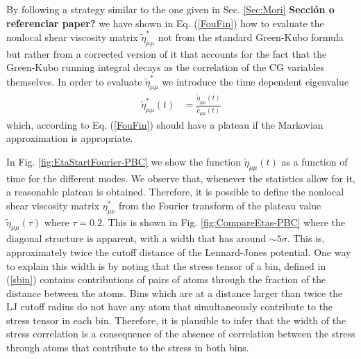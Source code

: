 \documentclass[a4paper,openright,12pt]{book}
\newcommand{\Note}[1]{{\bf \color{red}#1}}    %
\begin{document}
By following a  strategy similar to the one given  in Sec. \ref{Sec:Mori} \Note{Sección o referenciar paper?} we
have shown in  Eq. (\ref{FouFin}) how to evaluate  the nonlocal shear
viscosity  matrix  $\tilde{\eta}^*_{\mu\mu}$  not  from  the  standard
Green-Kubo  formula but  rather from  a corrected  version of  it that
accounts for the  fact that the Green-Kubo running  integral decays as
the correlation of  the CG variables themselves. In  order to evaluate
$\tilde{\eta}^*_{\mu\mu}$ we introduce the time dependent eigenvalue
\begin{align}
\tilde{\eta}_{\mu\mu}^*(t)&=\frac{\tilde{\eta}_{\mu\mu}(t) }{\tilde{c}_{\mu\mu}(t)}
\label{FouFint}
\end{align}
which, according  to Eq. (\ref{FouFin})  should have a plateau  if the
Markovian approximation is appropriate.

In    Fig.      \ref{fig:EtaStartFourier-PBC}    we    show     the    function
$\tilde{\eta}_{\mu\mu}(t)$  as a  function of  time for  the different
modes.   We observe  that, whenever  the  statistics allow  for it,  a
reasonable plateau  is obtained. Therefore,  it is possible  to define
the  nonlocal  shear  viscosity  matrix  $\eta^*_{\mu\nu}$  from  the
Fourier transform  of the plateau  value $\tilde{\eta}_{\mu\mu}(\tau)$
where $\tau=0.2$.  This  is shown in Fig.  \ref{fig:CompareEtas-PBC} where the
diagonal structure  is apparent,  with a width  that has  around $\sim
5\sigma$.  This  is, approximately  twice the  cutoff distance  of the
Lennard-Jones potential.  One way to  explain this width is  by noting
that  the stress  tensor of  a bin,  defined in  (\ref{sbin}) contains
contributions of pairs  of atoms through the fraction  of the distance
between the atoms. Bins which are  at a distance larger than twice the
LJ cutoff radius  do not have any atom  that simultaneously contribute
to the stress tensor in each  bin. Therefore, it is plausible to infer
that the width of the stress correlation is a consequence of the absence
of correlation between the stress through atoms that contribute to the stress
in both bins.
\end{document}
